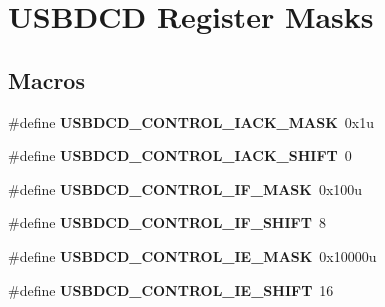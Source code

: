 \hypertarget{group___u_s_b_d_c_d___register___masks}{}\section{U\+S\+B\+D\+C\+D Register Masks}
\label{group___u_s_b_d_c_d___register___masks}
\subsection*{Macros}
\begin{DoxyCompactItemize}
\item 
\hypertarget{group___u_s_b_d_c_d___register___masks_ga23b5eadab7d4201af1198723a3b93ae5}{}\#define {\bfseries U\+S\+B\+D\+C\+D\+\_\+\+C\+O\+N\+T\+R\+O\+L\+\_\+\+I\+A\+C\+K\+\_\+\+M\+A\+S\+K}~0x1u\label{group___u_s_b_d_c_d___register___masks_ga23b5eadab7d4201af1198723a3b93ae5}

\item 
\hypertarget{group___u_s_b_d_c_d___register___masks_ga4a96149273b083d48c5917e9b915b92f}{}\#define {\bfseries U\+S\+B\+D\+C\+D\+\_\+\+C\+O\+N\+T\+R\+O\+L\+\_\+\+I\+A\+C\+K\+\_\+\+S\+H\+I\+F\+T}~0\label{group___u_s_b_d_c_d___register___masks_ga4a96149273b083d48c5917e9b915b92f}

\item 
\hypertarget{group___u_s_b_d_c_d___register___masks_gabedad7b2fec7990f45af8add013a19c7}{}\#define {\bfseries U\+S\+B\+D\+C\+D\+\_\+\+C\+O\+N\+T\+R\+O\+L\+\_\+\+I\+F\+\_\+\+M\+A\+S\+K}~0x100u\label{group___u_s_b_d_c_d___register___masks_gabedad7b2fec7990f45af8add013a19c7}

\item 
\hypertarget{group___u_s_b_d_c_d___register___masks_ga576f9434f9947991055f40c1ab3a38c1}{}\#define {\bfseries U\+S\+B\+D\+C\+D\+\_\+\+C\+O\+N\+T\+R\+O\+L\+\_\+\+I\+F\+\_\+\+S\+H\+I\+F\+T}~8\label{group___u_s_b_d_c_d___register___masks_ga576f9434f9947991055f40c1ab3a38c1}

\item 
\hypertarget{group___u_s_b_d_c_d___register___masks_ga44f183d0863aeac1154727de57ee6fb6}{}\#define {\bfseries U\+S\+B\+D\+C\+D\+\_\+\+C\+O\+N\+T\+R\+O\+L\+\_\+\+I\+E\+\_\+\+M\+A\+S\+K}~0x10000u\label{group___u_s_b_d_c_d___register___masks_ga44f183d0863aeac1154727de57ee6fb6}

\item 
\hypertarget{group___u_s_b_d_c_d___register___masks_ga33f53d29349cc16bb002486da4472ece}{}\#define {\bfseries U\+S\+B\+D\+C\+D\+\_\+\+C\+O\+N\+T\+R\+O\+L\+\_\+\+I\+E\+\_\+\+S\+H\+I\+F\+T}~16\label{group___u_s_b_d_c_d___register___masks_ga33f53d29349cc16bb002486da4472ece}


\end{DoxyCompactItemize}
